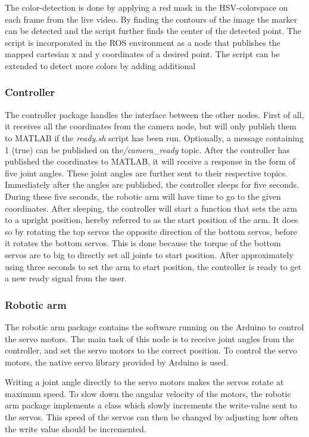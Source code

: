 \documentclass[11pt,a4paper, titlepage]{article}
\begin{document}
The color-detection is done by applying a red mask in the HSV-colorspace on each frame from the live video. By finding the contours of the image the marker can be detected and the script further finds the center of the detected point. The script is incorporated in the ROS environment as a node that publishes the mapped cartesian x and y coordinates of a desired point. The script can be extended to detect more colors by adding additional

\subsubsection{Controller}
The controller package handles the interface between the other nodes. First of all, it receives all the coordinates from the camera node, but will only publish them to MATLAB if the \textit{ready.sh} script has been run. Optionally, a message containing 1 (true) can be published on the\textit{/camera\_ready} topic. After the controller has published the coordinates to MATLAB, it will receive a response in the form of five joint angles. These joint angles are further sent to their respective topics. Immediately after the angles are published, the controller sleeps for five seconds. During these five seconds, the robotic arm will have time to go to the given coordinates. After sleeping, the controller will start a function that sets the arm to a upright position, hereby referred to as the start position of the arm. It does so by rotating the top servos the opposite direction of the bottom servos, before it rotates the bottom servos. This is done because the torque of the bottom servos are to big to directly set all joints to start position. After approximately using three seconds to set the arm to start position, the controller is ready to get a new ready signal from the user.

\subsubsection{Robotic arm}
The robotic arm package contains the software running on the Arduino to control the servo motors. The main task of this node is to receive joint angles from the controller, and set the servo motors to the correct position. To control the servo motors, the native servo library provided by Arduino is used.

Writing a joint angle directly to the servo motors makes the servos rotate at maximum speed. To slow down the angular velocity of the motors, the robotic arm package implements a class which slowly increments the write-value sent to the servos. This speed of the servos can then be changed by adjusting how often the write value should be incremented.
\end{document}
